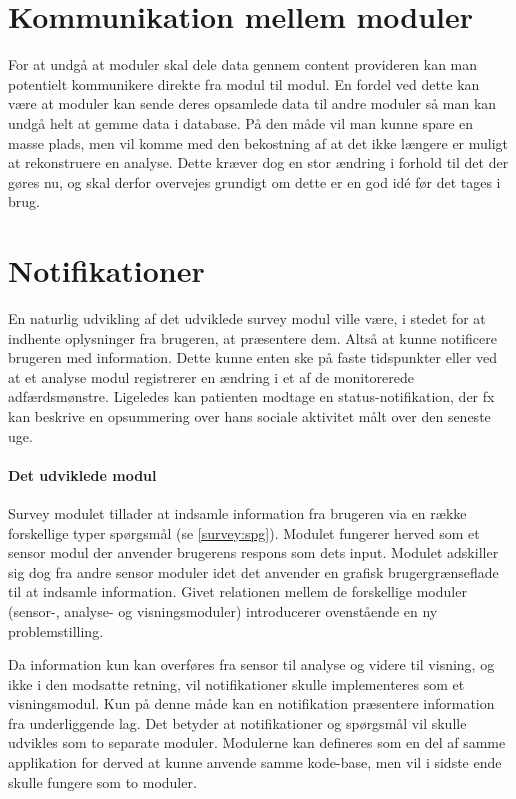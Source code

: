 \section{Kommunikation mellem moduler}
For at undgå at moduler skal dele data gennem content provideren kan man potentielt kommunikere direkte fra modul til modul.
En fordel ved dette kan være at moduler kan sende deres opsamlede data til andre moduler så man kan undgå helt at gemme data i database.
På den måde vil man kunne spare en masse plads, men vil komme med den bekostning af at det ikke længere er muligt at rekonstruere en analyse.
Dette kræver dog en stor ændring i forhold til det der gøres nu, og skal derfor overvejes grundigt om dette er en god idé før det tages i brug.



\section{Notifikationer}
En naturlig udvikling af det udviklede survey modul ville være, i stedet for at indhente oplysninger fra brugeren, at præsentere dem.
Altså at kunne notificere brugeren med information.
Dette kunne enten ske på faste tidspunkter eller ved at et analyse modul registrerer en ændring i et af de monitorerede adfærdsmønstre.
Ligeledes kan patienten modtage en status-notifikation, der fx kan beskrive en opsummering over hans sociale aktivitet målt over den seneste uge.

\paragraph{Det udviklede modul}
Survey modulet tillader at indsamle information fra brugeren via en række forskellige typer spørgsmål (se \cref{survey:spg}).
Modulet fungerer herved som et sensor modul der anvender brugerens respons som dets input.
Modulet adskiller sig dog fra andre sensor moduler idet det anvender en grafisk brugergrænseflade til at indsamle information.
Givet relationen mellem de forskellige moduler (sensor-, analyse- og visningsmoduler) introducerer ovenstående en ny problemstilling.

Da information kun kan overføres fra sensor til analyse og videre til visning, og ikke i den modsatte retning, vil notifikationer skulle implementeres som et visningsmodul.
Kun på denne måde kan en notifikation præsentere information fra underliggende lag.
Det betyder at notifikationer og spørgsmål vil skulle udvikles som to separate moduler.
Modulerne kan defineres som en del af samme applikation for derved at kunne anvende samme kode-base, men vil i sidste ende skulle fungere som to moduler.

